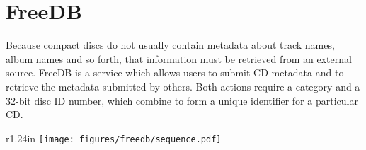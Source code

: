 
\chapter{FreeDB}
Because compact discs do not usually contain metadata about
track names, album names and so forth, that information
must be retrieved from an external source.
FreeDB is a service which allows users to submit CD
metadata and to retrieve the metadata submitted by others.
Both actions require a category and a 32-bit disc ID number,
which combine to form a unique identifier for a particular CD.




\begin{wrapfigure}[18]{r}{1.24in}
\texttt{[image: figures/freedb/sequence.pdf]}
\end{wrapfigure}
